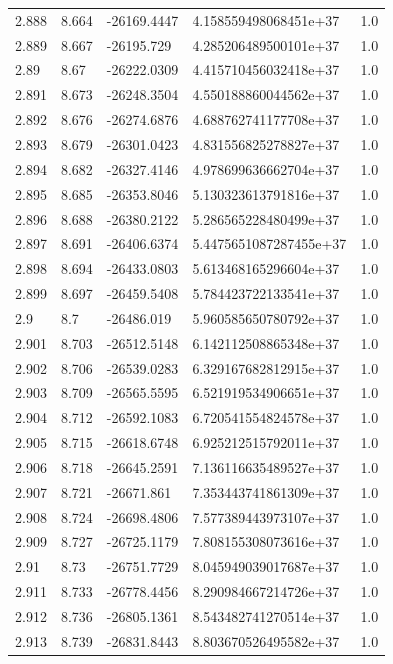 \begin{tabular}{lllll}
2.888 & 8.664 & -26169.4447 & 4.158559498068451e+37 & 1.0 \\
2.889 & 8.667 & -26195.729 & 4.285206489500101e+37 & 1.0 \\
2.89 & 8.67 & -26222.0309 & 4.415710456032418e+37 & 1.0 \\
2.891 & 8.673 & -26248.3504 & 4.550188860044562e+37 & 1.0 \\
2.892 & 8.676 & -26274.6876 & 4.688762741177708e+37 & 1.0 \\
2.893 & 8.679 & -26301.0423 & 4.831556825278827e+37 & 1.0 \\
2.894 & 8.682 & -26327.4146 & 4.978699636662704e+37 & 1.0 \\
2.895 & 8.685 & -26353.8046 & 5.130323613791816e+37 & 1.0 \\
2.896 & 8.688 & -26380.2122 & 5.286565228480499e+37 & 1.0 \\
2.897 & 8.691 & -26406.6374 & 5.4475651087287455e+37 & 1.0 \\
2.898 & 8.694 & -26433.0803 & 5.613468165296604e+37 & 1.0 \\
2.899 & 8.697 & -26459.5408 & 5.784423722133541e+37 & 1.0 \\
2.9 & 8.7 & -26486.019 & 5.960585650780792e+37 & 1.0 \\
2.901 & 8.703 & -26512.5148 & 6.142112508865348e+37 & 1.0 \\
2.902 & 8.706 & -26539.0283 & 6.329167682812915e+37 & 1.0 \\
2.903 & 8.709 & -26565.5595 & 6.521919534906651e+37 & 1.0 \\
2.904 & 8.712 & -26592.1083 & 6.720541554824578e+37 & 1.0 \\
2.905 & 8.715 & -26618.6748 & 6.925212515792011e+37 & 1.0 \\
2.906 & 8.718 & -26645.2591 & 7.136116635489527e+37 & 1.0 \\
2.907 & 8.721 & -26671.861 & 7.353443741861309e+37 & 1.0 \\
2.908 & 8.724 & -26698.4806 & 7.577389443973107e+37 & 1.0 \\
2.909 & 8.727 & -26725.1179 & 7.808155308073616e+37 & 1.0 \\
2.91 & 8.73 & -26751.7729 & 8.045949039017687e+37 & 1.0 \\
2.911 & 8.733 & -26778.4456 & 8.290984667214726e+37 & 1.0 \\
2.912 & 8.736 & -26805.1361 & 8.543482741270514e+37 & 1.0 \\
2.913 & 8.739 & -26831.8443 & 8.803670526495582e+37 & 1.0 \\

\end{tabular}
